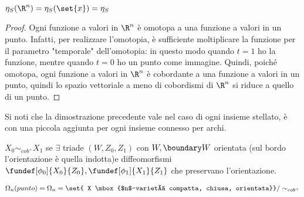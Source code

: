 \begin{cor}
 $\eta_S (\R ^n) = \eta_S (\set{x}) = \eta_S $
\end{cor}
\begin{proof}
 Ogni funzione a valori in $\R^n$ è omotopa a una funzione a valori in un punto. Infatti, per realizzare l'omotopia, è sufficiente moltiplicare la funzione per il parametro "temporale" dell'omotopia: in questo modo quando $t=1$ ho la funzione, mentre quando $t=0$ ho un punto come immagine. \footnotemark
 Quindi, poiché omotopa, ogni funzione a valori in $\R^n$ è cobordante a una funzione a valori in un punto, quindi lo spazio vettoriale a meno di cobordismi di $\R^n$ si riduce a quello di un punto.
\end{proof}

Si noti che la dimostrazione precedente vale nel caso di ogni insieme stellato, è con una piccola aggiunta per ogni insieme connesso per archi.

\begin{defn}
 $X_0\sim_{cob^+}X_1$ se $\exists$ triade $(W, Z_0, Z_1)$ con $W, \boundary W$ orientata (sul bordo l'orientazione è quella indotta)e diffeomorfismi $\fundef[\phi_0]{X_0}{Z_0}, \fundef[\phi_1]{X_1}{Z_1}$ che preservano l'orientazione.
\end{defn}

\begin{defn}
 $\Omega _n(punto)=\Omega _n = \set{ X \mbox{$n$-varietà compatta, chiusa, orientata}} /\sim_{cob^+}$
\end{defn}

